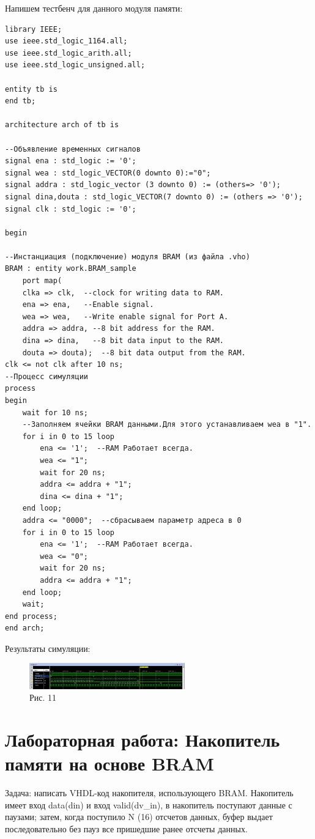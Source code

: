 Напишем тестбенч для данного модуля памяти: 
\begin{Code}
\begin{lstlisting}
library IEEE;
use ieee.std_logic_1164.all;
use ieee.std_logic_arith.all;
use ieee.std_logic_unsigned.all;

entity tb is   
end tb;

architecture arch of tb is

--Объявление временных сигналов
signal ena : std_logic := '0';
signal wea : std_logic_VECTOR(0 downto 0):="0";
signal addra : std_logic_vector (3 downto 0) := (others=> '0');
signal dina,douta : std_logic_VECTOR(7 downto 0) := (others => '0');
signal clk : std_logic := '0';

begin

--Инстанциация (подключение) модуля BRAM (из файла .vho)
BRAM : entity work.BRAM_sample
    port map(
    clka => clk,  --clock for writing data to RAM.
    ena => ena,   --Enable signal.
    wea => wea,   --Write enable signal for Port A.
    addra => addra, --8 bit address for the RAM.
    dina => dina,   --8 bit data input to the RAM.
    douta => douta);  --8 bit data output from the RAM. 
clk <= not clk after 10 ns;
--Процесс симуляции
process
begin
    wait for 10 ns;
    --Заполняем ячейки BRAM данными.Для этого устанавливаем wea в "1".
    for i in 0 to 15 loop
        ena <= '1';  --RAM Работает всегда.
        wea <= "1";
        wait for 20 ns;
        addra <= addra + "1";
        dina <= dina + "1";
    end loop;   
    addra <= "0000";  --сбрасываем параметр адреса в 0
    for i in 0 to 15 loop
        ena <= '1';  --RAM Работает всегда.
        wea <= "0";
        wait for 20 ns;
        addra <= addra + "1";
    end loop;
    wait;
end process;     
end arch;
\end{lstlisting}
\end{Code}

Результаты симуляции:

\begin{figure}[h]
\centering
\includegraphics[width=0.6\textwidth]{11}
\caption{Рис. 11}
\label{11_label}
\end{figure}

\section{Лабораторная работа: Накопитель памяти на основе BRAM}
Задача: написать VHDL-код накопителя, использующего BRAM. Накопитель имеет вход data(din) и вход valid(dv_in), в накопитель поступают данные с паузами; затем, когда поступило N (16) отсчетов данных, буфер выдает последовательно без пауз все пришедшие ранее отсчеты данных.
